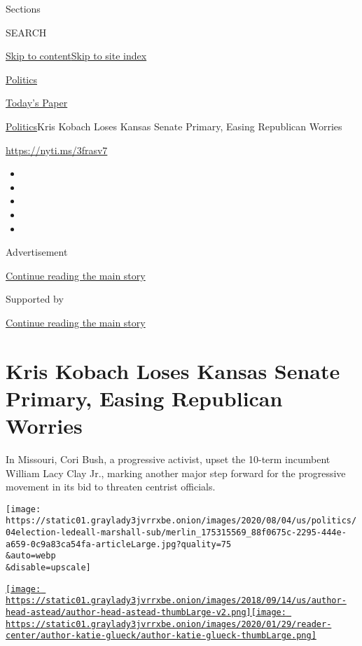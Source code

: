 Sections

SEARCH

\protect\hyperlink{site-content}{Skip to
content}\protect\hyperlink{site-index}{Skip to site index}

\href{https://www.nytimes3xbfgragh.onion/section/politics}{Politics}

\href{https://myaccount.nytimes3xbfgragh.onion/auth/login?response_type=cookie\&client_id=vi}{}

\href{https://www.nytimes3xbfgragh.onion/section/todayspaper}{Today's
Paper}

\href{/section/politics}{Politics}\textbar{}Kris Kobach Loses Kansas
Senate Primary, Easing Republican Worries

\url{https://nyti.ms/3frasv7}

\begin{itemize}
\item
\item
\item
\item
\item
\end{itemize}

Advertisement

\protect\hyperlink{after-top}{Continue reading the main story}

Supported by

\protect\hyperlink{after-sponsor}{Continue reading the main story}

\hypertarget{kris-kobach-loses-kansas-senate-primary-easing-republican-worries}{%
\section{Kris Kobach Loses Kansas Senate Primary, Easing Republican
Worries}\label{kris-kobach-loses-kansas-senate-primary-easing-republican-worries}}

In Missouri, Cori Bush, a progressive activist, upset the 10-term
incumbent William Lacy Clay Jr., marking another major step forward for
the progressive movement in its bid to threaten centrist officials.

\texttt{[image: https://static01.graylady3jvrrxbe.onion/images/2020/08/04/us/politics/04election-ledeall-marshall-sub/merlin\_175315569\_88f0675c-2295-444e-a659-0c9a83ca54fa-articleLarge.jpg?quality=75\\\&auto=webp\\\&disable=upscale]}

\href{https://www.nytimes3xbfgragh.onion/by/astead-w-herndon}{\texttt{[image: https://static01.graylady3jvrrxbe.onion/images/2018/09/14/us/author-head-astead/author-head-astead-thumbLarge-v2.png]}}\href{https://www.nytimes3xbfgragh.onion/by/katie-glueck}{\texttt{[image: https://static01.graylady3jvrrxbe.onion/images/2020/01/29/reader-center/author-katie-glueck/author-katie-glueck-thumbLarge.png]}}

